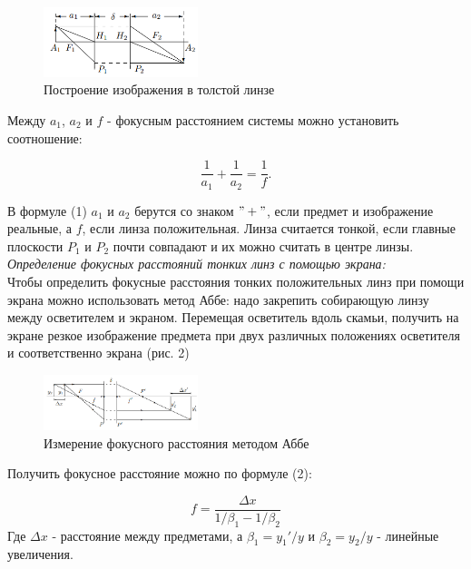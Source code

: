 \documentclass[a4paper, 12pt]{article}%
\newcommand{\RomanNumeralCaps}[1]{\uppercase\expandafter{\romannumeral#1}}
\begin{document}
	\begin{figure}[H]
		\begin{center}
			\includegraphics[width = 0.4\textwidth]{1.png}
			\caption{Построение изображения в толстой линзе}
		\end{center}
	\end{figure}
	
	Между $a_1$, $a_2$ и $f$ - фокусным расстоянием системы можно установить соотношение:
	
	\begin{equation}
	\frac{1}{a_1} + \frac{1}{a_2} = \frac{1}{f}.
	\end{equation}
	
	В формуле (1) $a_1$ и $a_2$ берутся со знаком $"+"$, если предмет и изображение реальные, а $f$, если линза положительная.
	Линза считается тонкой, если главные плоскости $P_1$ и $P_2$ почти совпадают и их можно считать в центре линзы.\\
	
	\RomanNumeralCaps 1 \textit{Определение фокусных расстояний тонких линз с помощью экрана:}\\
	
	Чтобы определить фокусные расстояния тонких положительных линз при помощи экрана можно использовать метод Аббе: надо закрепить собирающую линзу между осветителем и экраном. Перемещая осветитель вдоль скамьи, получить на экране резкое изображение
	предмета при двух различных положениях осветителя и
	соответственно экрана (рис. 2)
	
	
	\begin{figure}[H]
		\begin{center}
			\includegraphics[width = 0.4\textwidth]{2.png}
			\caption{Измерение фокусного расстояния методом Аббе}
		\end{center}
	\end{figure}
	
	Получить фокусное расстояние можно по формуле (2):
	
	\begin{equation}
		f = \frac{\Delta x}{1/\beta_1 - 1/\beta_2} 
	\end{equation}
	Где $\Delta x$ - расстояние между предметами, а $\beta_1 = y_1'/y$ и $\beta_2 = y_2/y$ - линейные увеличения. 
	
\end{document}
